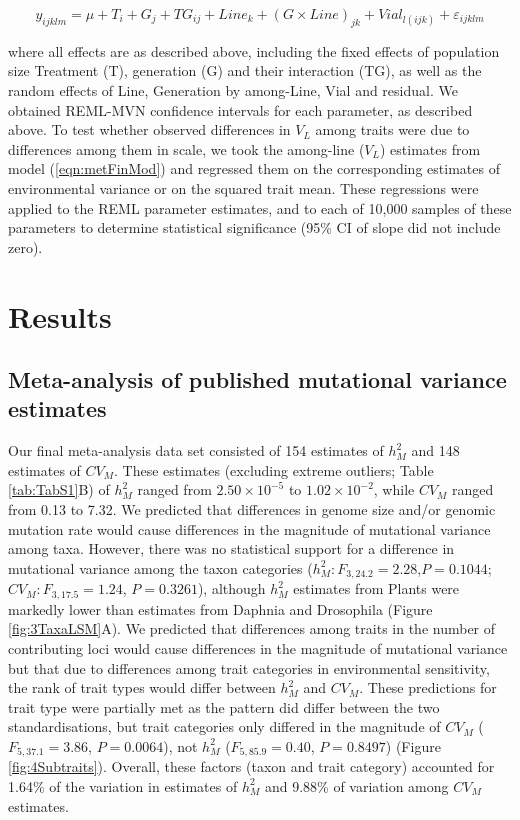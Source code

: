 \begin{equation}
\label{eqn:metFinMod}
y_{ijklm}=\mu + T_i+ G_j + TG_{ij} + Line_k + (G \times Line)_{jk} + Vial_{l(ijk)} + \varepsilon_{ijklm}
\end{equation}

\noindent where all effects are as described above, including the fixed effects of population size Treatment (T), generation (G) and their interaction (TG), as well as the random effects of Line, Generation by among-Line, Vial and residual. We obtained REML-MVN confidence intervals for each parameter, as described above. To test whether observed differences in $V_L$ among traits were due to differences among them in scale, we took the among-line ($V_L$) estimates from model (\ref{eqn:metFinMod}) and regressed them on the corresponding estimates of environmental variance or on the squared trait mean. These regressions were applied to the REML parameter estimates, and to each of 10,000 samples of these parameters to determine statistical significance (95\% CI of slope did not include zero).\par

\section{Results}
\subsection{Meta-analysis of published mutational variance estimates}
Our final meta-analysis data set consisted of 154 estimates of $h_M^2$ and 148 estimates of $CV_M$. These estimates (excluding extreme outliers; Table \ref{tab:TabS1}B) of $h_M^2$ ranged from $2.50\times10^{-5}$ to $1.02\times10^{-2}$, while $CV_M$ ranged from 0.13 to 7.32. We predicted that differences in genome size and/or genomic mutation rate would cause differences in the magnitude of mutational variance among taxa. However, there was no statistical support for a difference in mutational variance among the taxon categories ($h_M^2{:} F_{3,24.2} = 2.28$,$P = 0.1044$; $CV_M{:} F_{3,17.5} = 1.24$, $P = 0.3261$), although $h_M^2$ estimates from Plants were markedly lower than estimates from Daphnia and Drosophila (Figure \ref{fig:3TaxaLSM}A). We predicted that differences among traits in the number of contributing loci would cause differences in the magnitude of mutational variance but that due to differences among trait categories in environmental sensitivity, the rank of trait types would differ between $h_M^2$ and $CV_M$. These predictions for trait type were partially met as the pattern did differ between the two standardisations, but trait categories only differed in the magnitude of $CV_M$ ($F_{5,37.1} = 3.86$, $P = 0.0064$), not $h_M^2$ ($F_{5,85.9} = 0.40$, $P = 0.8497$) (Figure \ref{fig:4Subtraits}). Overall, these factors (taxon and trait category) accounted for 1.64\% of the variation in estimates of $h_M^2$ and 9.88\% of variation among $CV_M$ estimates. \par

